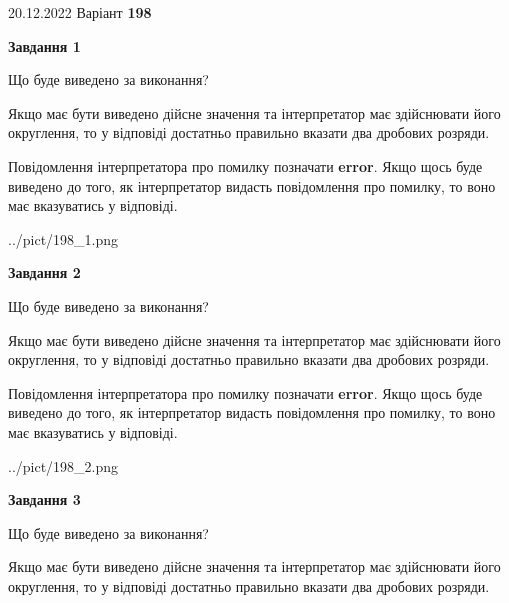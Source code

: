 \documentclass[12pt, ukrainian]{article}
\begin{document}
{20.12.2022 Варіант \No \textbf { 198 }\par}
{
\begin {Large}

{\begin {center}\textbf{Завдання 1}\end {center}}\par
Що буде виведено за виконання? \par

Якщо має бути виведено дійсне значення та інтерпретатор має здійснювати його округлення, 
то у відповіді достатньо правильно вказати два дробових розряди.

Повідомлення інтерпретатора про помилку позначати \textbf{error}.
Якщо щось буде виведено до того, як інтерпретатор видасть повідомлення про помилку, 
то воно має вказуватись у відповіді. \par

\begin{center}
	{../pict/198_1.png}
\end{center}
\newpage

{\begin {center}\textbf{Завдання 2}\end {center}}\par
Що буде виведено за виконання? \par

Якщо має бути виведено дійсне значення та інтерпретатор має здійснювати його округлення, 
то у відповіді достатньо правильно вказати два дробових розряди.

Повідомлення інтерпретатора про помилку позначати \textbf{error}.
Якщо щось буде виведено до того, як інтерпретатор видасть повідомлення про помилку, 
то воно має вказуватись у відповіді. \par

\begin{center}
	{../pict/198_2.png}
\end{center}
\newpage

{\begin {center}\textbf{Завдання 3}\end {center}}\par
Що буде виведено за виконання? \par

Якщо має бути виведено дійсне значення та інтерпретатор має здійснювати його округлення, 
то у відповіді достатньо правильно вказати два дробових розряди.


\end{Large}}
\end{document}
